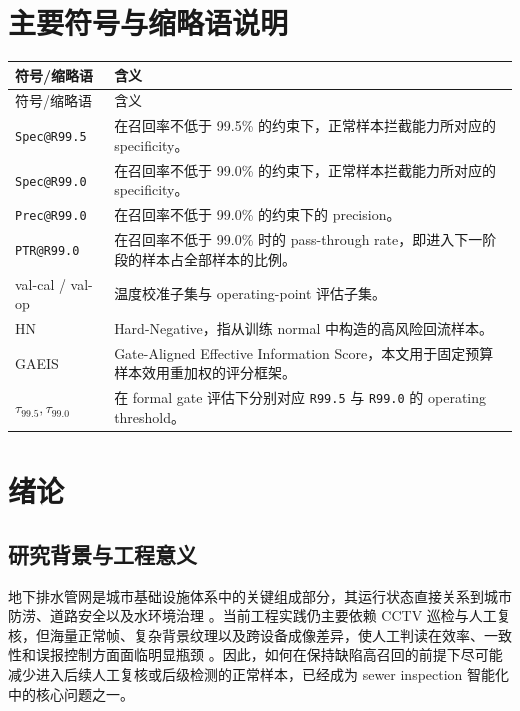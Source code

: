 \documentclass[UTF8,openany,12pt]{ctexbook}
\newcommand{\formalmetric}[1]{\texttt{#1}}
\begin{document}
\tableofcontents
\listoffigures
\listoftables

\chapter*{主要符号与缩略语说明}
\begin{longtable}{p{3.2cm}p{10.4cm}}
\toprule
符号/缩略语 & 含义 \\
\midrule
\endfirsthead
\toprule
符号/缩略语 & 含义 \\
\midrule
\endhead
\formalmetric{Spec@R99.5} & 在召回率不低于 99.5\% 的约束下，正常样本拦截能力所对应的 specificity。 \\
\formalmetric{Spec@R99.0} & 在召回率不低于 99.0\% 的约束下，正常样本拦截能力所对应的 specificity。 \\
\formalmetric{Prec@R99.0} & 在召回率不低于 99.0\% 的约束下的 precision。 \\
\formalmetric{PTR@R99.0} & 在召回率不低于 99.0\% 时的 pass-through rate，即进入下一阶段的样本占全部样本的比例。 \\
val-cal / val-op & 温度校准子集与 operating-point 评估子集。 \\
HN & Hard-Negative，指从训练 normal 中构造的高风险回流样本。 \\
GAEIS & Gate-Aligned Effective Information Score，本文用于固定预算样本效用重加权的评分框架。 \\
$\tau_{99.5}, \tau_{99.0}$ & 在 formal gate 评估下分别对应 \formalmetric{R99.5} 与 \formalmetric{R99.0} 的 operating threshold。 \\
\bottomrule
\end{longtable}

\mainmatter

\chapter{绪论}

\section{研究背景与工程意义}
地下排水管网是城市基础设施体系中的关键组成部分，其运行状态直接关系到城市防涝、道路安全以及水环境治理 \cite{moradi2019review,haurum2020survey,ma2026stateoftheart}。当前工程实践仍主要依赖 CCTV 巡检与人工复核，但海量正常帧、复杂背景纹理以及跨设备成像差异，使人工判读在效率、一致性和误报控制方面面临明显瓶颈 \cite{haurum2020survey,cheng2018deep}。因此，如何在保持缺陷高召回的前提下尽可能减少进入后续人工复核或后级检测的正常样本，已经成为 sewer inspection 智能化中的核心问题之一。
\end{document}

